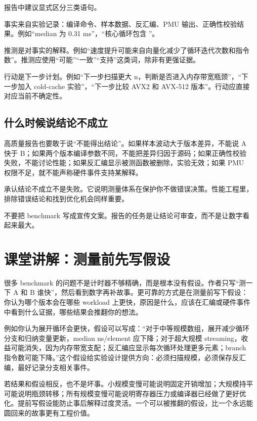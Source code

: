 报告中建议显式区分三类语句。

事实来自实验记录：编译命令、样本数据、反汇编、PMU 输出、正确性校验结果。例如“median 为 0.31 ms”，“核心循环包含 ”。

推测是对事实的解释。例如“速度提升可能来自向量化减少了循环迭代次数和指令数”。推测应使用“可能”“一致”“支持”这类词，除非有更强证据。

行动是下一步计划。例如“下一步扫描更大 n，判断是否进入内存带宽瓶颈”，“下一步加入 cold-cache 实验”，“下一步比较 AVX2 和 AVX-512 版本”。行动应直接对应当前不确定性。

\subsection{什么时候说结论不成立}

高质量报告也要敢于说“不能得出结论”。如果样本波动大于版本差异，不能说 A 快于 B；如果两个版本编译参数不同，不能把差异归因于源码；如果正确性校验失败，不能讨论性能；如果反汇编显示被测函数被删除，实验无效；如果 PMU 权限不足，就不能声称硬件事件支持某解释。

承认结论不成立不是失败。它说明测量体系在保护你不做错误决策。性能工程里，排除错误结论和找到优化机会同样重要。

\begin{warningbox}
不要把 benchmark 写成宣传文案。报告的任务是让结论可审查，而不是让数字看起来最大。
\end{warningbox}

\section{课堂讲解：测量前先写假设}

很多 benchmark 的问题不是计时器不够精确，而是根本没有假设。作者只写“测一下 A 和 B 谁快”，然后看到数字再补故事。更可靠的方式是在测量前写下假设：你认为哪个版本会在哪些 workload 上更快，原因是什么，应该在汇编或硬件事件中看到什么证据，哪些结果会推翻你的想法。

例如你认为展开循环会更快，假设可以写成：“对于中等规模数组，展开减少循环分支和归纳变量更新，median ns/element 应下降；对于超大规模 streaming，收益可能消失，因为内存带宽支配；反汇编应显示每次循环处理更多元素；branch 指令数可能下降。”这个假设给实验设计提供方向：必须扫描规模，必须保存反汇编，最好记录分支相关事件。

若结果和假设相反，也不是坏事。小规模变慢可能说明固定开销增加；大规模持平可能说明瓶颈转移；所有规模变慢可能说明寄存器压力或编译器已经做了更好优化。提前写假设能防止事后解释过度灵活。一个可以被推翻的假设，比一个永远能圆回来的故事更有工程价值。


